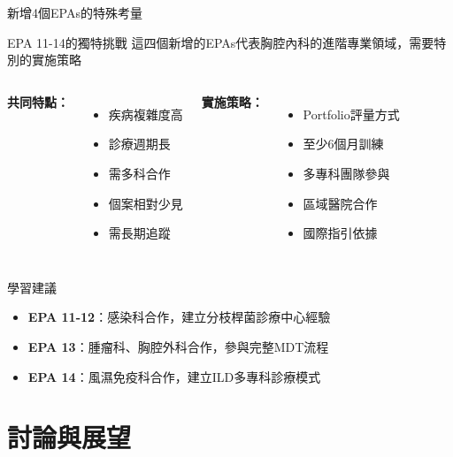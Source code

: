 \documentclass[aspectratio=169]{beamer}
\begin{document}
\begin{frame}{新增4個EPAs的特殊考量}
\begin{alertblock}{EPA 11-14的獨特挑戰}
這四個新增的EPAs代表胸腔內科的進階專業領域，需要特別的實施策略
\end{alertblock}

\begin{columns}[c]
\textbf{共同特點：}
\begin{itemize}
\item 疾病複雜度高
\item 診療週期長
\item 需多科合作
\item 個案相對少見
\item 需長期追蹤
\end{itemize}

\textbf{實施策略：}
\begin{itemize}
\item Portfolio評量方式
\item 至少6個月訓練
\item 多專科團隊參與
\item 區域醫院合作
\item 國際指引依據
\end{itemize}
\end{columns}

\vspace{0.5cm}

\begin{block}{學習建議}
\begin{itemize}
\item \textbf{EPA 11-12}：感染科合作，建立分枝桿菌診療中心經驗
\item \textbf{EPA 13}：腫瘤科、胸腔外科合作，參與完整MDT流程
\item \textbf{EPA 14}：風濕免疫科合作，建立ILD多專科診療模式
\end{itemize}
\end{block}
\end{frame}

\section{討論與展望}
\end{document}
